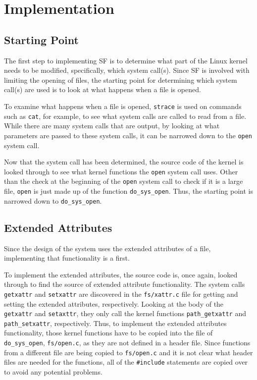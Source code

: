 \section{Implementation}

\subsection{Starting Point}

The first step to implementing SF is to determine what part of the Linux kernel needs to be modified, specifically, which system call(s). Since SF is involved with limiting the opening of files, the starting point for determining which system call(s) are used is to look at what happens when a file is opened.

To examine what happens when a file is opened, \texttt{strace} is used on commands such as \texttt{cat}, for example, to see what system calls are called to read from a file. While there are many system calls that are output, by looking at what parameters are passed to these system calls, it can be narrowed down to the \texttt{open} system call.

Now that the system call has been determined, the source code of the kernel is looked through to see what kernel functions the \texttt{open} system call uses. Other than the check at the beginning of the \texttt{open} system call to check if it is a large file, \texttt{open} is just made up of the function \texttt{do\_sys\_open}. Thus, the starting point is narrowed down to \texttt{do\_sys\_open}.

\subsection{Extended Attributes}

Since the design of the system uses the extended attributes of a file, implementing that functionality is a first.

To implement the extended attributes, the source code is, once again, looked through to find the source of extended attribute functionality. The system calls \texttt{getxattr} and \texttt{setxattr} are discovered in the \texttt{fs/xattr.c} file for getting and setting the extended attributes, respectively. Looking at the body of the \texttt{getxattr} and \texttt{setaxttr}, they only call the kernel functions \texttt{path\_getxattr} and \texttt{path\_setxattr}, respectively. Thus, to implement the extended attributes functionality, those kernel functions have to be copied into the file of \texttt{do\_sys\_open}, \texttt{fs/open.c}, as they are not defined in a header file. Since functions from a different file are being copied to \texttt{fs/open.c} and it is not clear what header files are needed for the functions, all of the \texttt{\#include} statements are copied over to avoid any potential problems.

